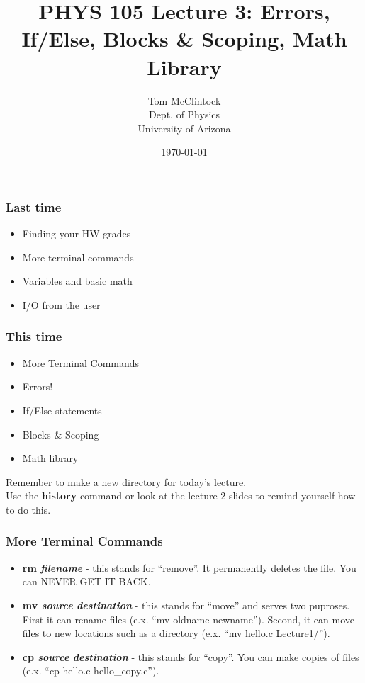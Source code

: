 \documentclass{beamer}
\title{PHYS 105 Lecture 3: Errors, If/Else, Blocks \& Scoping, Math Library}
\author{Tom McClintock \\
	Dept. of Physics\\
	University of Arizona
}
\date{\today}
\begin{document}
\begin{frame}
  \titlepage
\end{frame}

\begin{frame}
  \frametitle{Last time}
  \begin{itemize}
    \item Finding your HW grades
    \item More terminal commands
    \item Variables and basic math
    \item I/O from the user
  \end{itemize}
\end{frame}

\begin{frame}
  \frametitle{This time}
  \begin{itemize}
    \item More Terminal Commands
    \item Errors!
    \item If/Else statements
    \item Blocks \& Scoping
    \item Math library
  \end{itemize}
  \vspace{12pt}
  Remember to make a new directory for today's lecture.\\
  Use the \textbf{history} command or look at the lecture 2 slides
  to remind yourself how to do this.
\end{frame}

\begin{frame}
  \frametitle{More Terminal Commands}
  \begin{itemize}
    \item \textbf{rm \textit{filename}} - this stands for ``remove''. 
      It permanently deletes the file. You can NEVER GET IT BACK.
    \item \textbf{mv \textit{source} \textit{destination}} - this stands
      for ``move'' and serves two puproses. First it can rename files 
      (e.x. ``mv oldname newname''). Second, it can move files to new
      locations such as a directory (e.x. ``mv hello.c Lecture1/'').
    \item \textbf{cp \textit{source} \textit{destination}} - this stands
      for ``copy''. You can make copies of files 
      (e.x. ``cp hello.c hello\_copy.c'').
  \end{itemize}
\end{frame}
\end{document}
